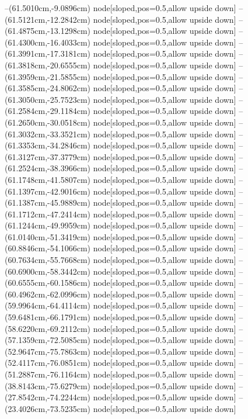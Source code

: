 --(61.5010cm,-9.0896cm) node[sloped,pos=0.5,allow upside down]{\arrowIn}
--(61.5121cm,-12.2842cm) node[sloped,pos=0.5,allow upside down]{\ArrowIn}
--(61.4875cm,-13.1298cm) node[sloped,pos=0.5,allow upside down]{\arrowIn}
--(61.4300cm,-16.4033cm) node[sloped,pos=0.5,allow upside down]{\ArrowIn}
--(61.3991cm,-17.3181cm) node[sloped,pos=0.5,allow upside down]{\arrowIn}
--(61.3818cm,-20.6555cm) node[sloped,pos=0.5,allow upside down]{\ArrowIn}
--(61.3959cm,-21.5855cm) node[sloped,pos=0.5,allow upside down]{\arrowIn}
--(61.3585cm,-24.8062cm) node[sloped,pos=0.5,allow upside down]{\ArrowIn}
--(61.3050cm,-25.7523cm) node[sloped,pos=0.5,allow upside down]{\arrowIn}
--(61.2584cm,-29.1184cm) node[sloped,pos=0.5,allow upside down]{\ArrowIn}
--(61.2650cm,-30.0518cm) node[sloped,pos=0.5,allow upside down]{\arrowIn}
--(61.3032cm,-33.3521cm) node[sloped,pos=0.5,allow upside down]{\ArrowIn}
--(61.3353cm,-34.2846cm) node[sloped,pos=0.5,allow upside down]{\arrowIn}
--(61.3127cm,-37.3779cm) node[sloped,pos=0.5,allow upside down]{\ArrowIn}
--(61.2524cm,-38.3966cm) node[sloped,pos=0.5,allow upside down]{\ArrowIn}
--(61.1748cm,-41.5807cm) node[sloped,pos=0.5,allow upside down]{\ArrowIn}
--(61.1397cm,-42.9016cm) node[sloped,pos=0.5,allow upside down]{\ArrowIn}
--(61.1387cm,-45.9889cm) node[sloped,pos=0.5,allow upside down]{\ArrowIn}
--(61.1712cm,-47.2414cm) node[sloped,pos=0.5,allow upside down]{\ArrowIn}
--(61.1244cm,-49.9959cm) node[sloped,pos=0.5,allow upside down]{\ArrowIn}
--(61.0140cm,-51.3419cm) node[sloped,pos=0.5,allow upside down]{\ArrowIn}
--(60.8846cm,-54.1066cm) node[sloped,pos=0.5,allow upside down]{\ArrowIn}
--(60.7634cm,-55.7668cm) node[sloped,pos=0.5,allow upside down]{\ArrowIn}
--(60.6900cm,-58.3442cm) node[sloped,pos=0.5,allow upside down]{\ArrowIn}
--(60.6555cm,-60.1586cm) node[sloped,pos=0.5,allow upside down]{\ArrowIn}
--(60.4962cm,-62.0996cm) node[sloped,pos=0.5,allow upside down]{\ArrowIn}
--(59.9964cm,-64.4114cm) node[sloped,pos=0.5,allow upside down]{\ArrowIn}
--(59.6481cm,-66.1791cm) node[sloped,pos=0.5,allow upside down]{\ArrowIn}
--(58.6220cm,-69.2112cm) node[sloped,pos=0.5,allow upside down]{\ArrowIn}
--(57.1359cm,-72.5085cm) node[sloped,pos=0.5,allow upside down]{\ArrowIn}
--(52.9647cm,-75.7863cm) node[sloped,pos=0.5,allow upside down]{\ArrowIn}
--(52.4117cm,-76.0851cm) node[sloped,pos=0.5,allow upside down]{\arrowIn}
--(51.2887cm,-76.1164cm) node[sloped,pos=0.5,allow upside down]{\ArrowIn}
--(38.8143cm,-75.6279cm) node[sloped,pos=0.5,allow upside down]{\ArrowIn}
--(27.8542cm,-74.2244cm) node[sloped,pos=0.5,allow upside down]{\ArrowIn}
--(23.4026cm,-73.5235cm) node[sloped,pos=0.5,allow upside down]{\ArrowIn}
